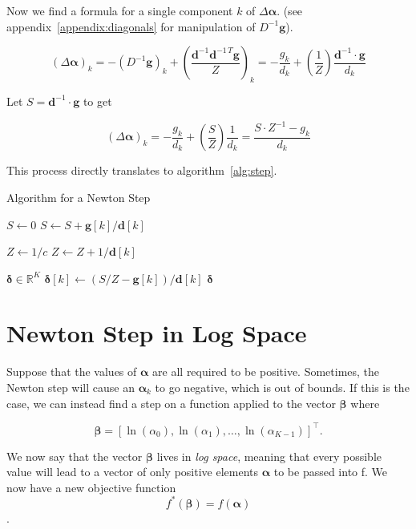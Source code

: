\documentclass[twoside]{article}
\begin{document}
Now we find a formula for a single component $k$ of $\Delta \boldsymbol{\alpha}$. (see appendix~\ref{appendix:diagonals} for manipulation of $D^{-1} \boldsymbol{g}$).

\[
\left(\Delta \boldsymbol{\alpha}\right)_k = - \left(D^{-1} \boldsymbol{g}\right)_k + \left(\frac{\boldsymbol{d}^{-1} \boldsymbol{d}^{-1\,T}\boldsymbol{g}}{Z}\right)_k
= - \frac{g_k}{d_k} + \left(\frac{1}{Z}\right)
 \frac{\boldsymbol{d}^{-1} \cdot \boldsymbol{g}}{d_k}
\]

Let $S = \boldsymbol{d}^{-1} \cdot \boldsymbol{g}$ to get

\[
\left(\Delta \boldsymbol{\alpha}\right)_k = - \frac{g_k}{d_k} + \left(\frac{S}{Z}\right)
\frac{1}{d_k} = \frac{S \cdot Z^{-1} - g_k}{d_k}
\]

This process directly translates to algorithm~\ref{alg:step}.

\begin{algorithm}
  \caption{Algorithm for a Newton Step}
  \begin{algorithmic}
  \State $S \leftarrow 0$
    \State $S \leftarrow S + \mathbf{g}[k] / \mathbf{d}[k]$
  \EndFor

  \State $Z \leftarrow 1/c$
    \State $Z \leftarrow Z + 1 / \mathbf{d}[k]$
  \EndFor
  
  \State $\mathbf{\delta} \in \mathbb{R}^{K}$
    \State $\mathbf{\delta}[k] \gets (S/Z - \mathbf{g}[k]) / \mathbf{d}[k]$
  \EndFor
  \State \Return $\mathbf{\delta}$
  \EndFunction
  \end{algorithmic}
  \label{alg:step}
\end{algorithm}

\section{Newton Step in Log Space}

Suppose that the values of $\boldsymbol{\alpha}$ are all required to be positive. Sometimes, the Newton step will cause an $\boldsymbol{\alpha}_k$ to go negative, which is out of bounds. If this is the case, we can instead find a step on a function applied to the vector $\boldsymbol{\beta}$ where

\[
   \boldsymbol{\beta} = [\ln({\alpha}_0), \ln({\alpha}_1), \dots, \ln({\alpha}_{K - 1})]^\top.
\]

We now say that the vector \(\boldsymbol{\beta}\) lives in \textit{log space}, meaning that every possible value will lead to a vector of only positive elements $\boldsymbol{\alpha}$ to be passed into f. We now have a new objective function \[f^*(\boldsymbol{\beta}) = f(\boldsymbol{\alpha})\].
\end{document}
